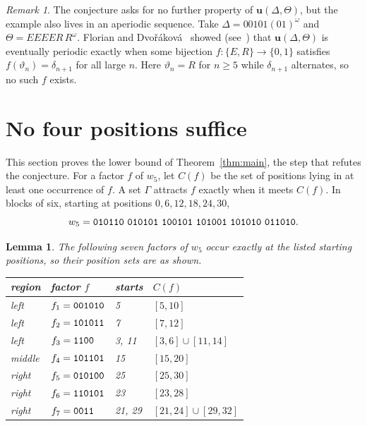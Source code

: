 \documentclass[11pt]{article}
\newtheorem{lemma}[theorem]{Lemma}
\theoremstyle{remark}
\newtheorem{remark}[theorem]{Remark}
\newcommand{\w}[1]{\textup{\texttt{#1}}}
\begin{document}
\begin{remark}
The conjecture asks for no further property of $\mathbf u(\Delta,\Theta)$, but
the example also lives in an aperiodic sequence. Take $\Delta=00101(01)^\omega$
and $\Theta=EEEER\,R^\omega$. Florian and Dvořáková~\cite{df} showed (see~\cite[Theorem~16]{dh}) that $\mathbf u(\Delta,\Theta)$ is eventually periodic exactly when some
bijection $f\colon\{E,R\}\to\{0,1\}$ satisfies $f(\vartheta_n)=\delta_{n+1}$ for
all large $n$. Here $\vartheta_n=R$ for $n\geq5$ while $\delta_{n+1}$ alternates,
so no such $f$ exists.
\end{remark}

\section{No four positions suffice}\label{sec:lower}

This section proves the lower bound of Theorem~\ref{thm:main}, the step that
refutes the conjecture. For a factor $f$ of $w_5$, let $C(f)$ be the set of
positions lying in at least one occurrence of $f$. A set $\Gamma$ attracts $f$
exactly when it meets $C(f)$. In blocks of six, starting at positions
$0,6,12,18,24,30$,
\[
w_5=\w{010110}\ \w{010101}\ \w{100101}\ \w{101001}\ \w{101010}\ \w{011010}.
\]

\begin{lemma}\label{lem:seven}
The following seven factors of $w_5$ occur exactly at the listed starting
positions, so their position sets are as shown.
\begin{center}\small\upshape
\begin{tabular}{@{}llll@{}}
\toprule
region & factor $f$ & starts & $C(f)$\\
\midrule
left   & $f_1=\w{001010}$ & 5 & $[5,10]$\\
left   & $f_2=\w{101011}$ & 7 & $[7,12]$\\
left   & $f_3=\w{1100}$ & 3, 11 & $[3,6]\cup[11,14]$\\
middle & $f_4=\w{101101}$ & 15 & $[15,20]$\\
right  & $f_5=\w{010100}$ & 25 & $[25,30]$\\
right  & $f_6=\w{110101}$ & 23 & $[23,28]$\\
right  & $f_7=\w{0011}$ & 21, 29 & $[21,24]\cup[29,32]$\\
\bottomrule
\end{tabular}
\end{center}
\end{lemma}
\end{document}

